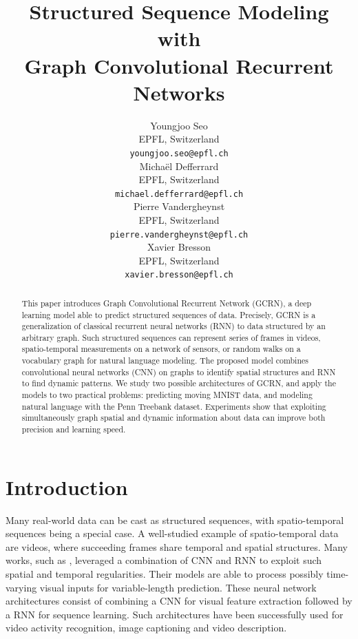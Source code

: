 \documentclass{article} %
\title{Structured Sequence Modeling with \\ Graph Convolutional Recurrent Networks}
\author{
Youngjoo Seo \\
EPFL, Switzerland \\
\texttt{youngjoo.seo@epfl.ch} \\
\And
Michaël Defferrard \\
EPFL, Switzerland \\
\texttt{michael.defferrard@epfl.ch} \\
\And
Pierre Vandergheynst \\
EPFL, Switzerland \\
\texttt{pierre.vandergheynst@epfl.ch} \\
\And
Xavier Bresson \\
EPFL, Switzerland \\
\texttt{xavier.bresson@epfl.ch} 
}
\begin{document}
\maketitle

\begin{abstract}
	This paper introduces Graph Convolutional Recurrent
	Network (GCRN), a deep learning model able to predict structured
	sequences of data. Precisely, GCRN is a generalization of classical recurrent neural networks (RNN) to
	data structured by an arbitrary graph. 
	Such structured sequences can represent series of frames in videos, spatio-temporal measurements on a network of
	sensors, or random walks on a vocabulary graph for natural language modeling.
	The proposed model combines convolutional neural networks (CNN) on graphs to identify spatial structures and RNN to find dynamic patterns. We study two possible architectures of GCRN, and apply the models to two practical
	problems: predicting moving MNIST data, and modeling natural language with the Penn
	Treebank dataset. Experiments show that exploiting simultaneously graph spatial and dynamic information about data can improve both precision and learning speed.
\end{abstract}

	

\section{Introduction}


Many real-world data can be cast as structured sequences, with spatio-temporal
sequences being a special case. A well-studied example of spatio-temporal data are videos, where
succeeding frames share temporal and spatial structures. Many works, such as \citet{cnnlstm1, cnnlstm2, cnnlstm3},  leveraged a combination of CNN and RNN to exploit such spatial and
temporal regularities. Their models are able to process possibly time-varying
visual inputs for variable-length prediction. These neural network architectures consist of combining
a CNN for visual feature extraction followed by a RNN for sequence learning. Such
architectures have been successfully used for video activity recognition, image
captioning and video description.
\end{document}
